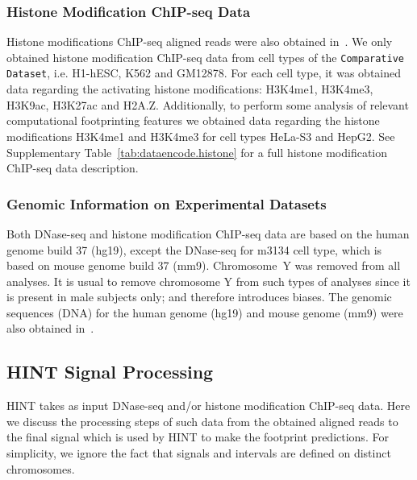 \subsubsection{Histone Modification ChIP-seq Data}

Histone modifications ChIP-seq aligned reads were also obtained in~\cite{encode2012}. We only obtained histone modification ChIP-seq data from cell types of the {\tt Comparative Dataset}, i.e. H1-hESC, K562 and GM12878. For each cell type, it was obtained data regarding the activating histone modifications: H3K4me1, H3K4me3, H3K9ac, H3K27ac and H2A.Z. Additionally, to perform some analysis of relevant computational footprinting features we obtained data regarding the histone modifications H3K4me1 and H3K4me3 for cell types HeLa-S3 and HepG2. See Supplementary Table~\ref{tab:dataencode.histone} for a full histone modification ChIP-seq data description.

\subsubsection{Genomic Information on Experimental Datasets}

Both DNase-seq and histone modification ChIP-seq data are based on the human genome build 37 (hg19), except the DNase-seq for m3134 cell type, which is based on mouse genome build 37 (mm9). Chromosome~Y was removed from all analyses. It is usual to remove chromosome Y from such types of analyses since it is present in male subjects only; and therefore introduces biases. The genomic sequences (DNA) for the human genome (hg19) and mouse genome (mm9) were also obtained in~\cite{encode2012}.

\subsection{HINT Signal Processing}
\label{sec:hint.signal.processing}

HINT takes as input DNase-seq and/or histone modification ChIP-seq data. Here we discuss the processing steps of such data from the obtained aligned reads to the final signal which is used by HINT to make the footprint predictions. For simplicity, we ignore the fact that signals and intervals are defined on distinct chromosomes.

